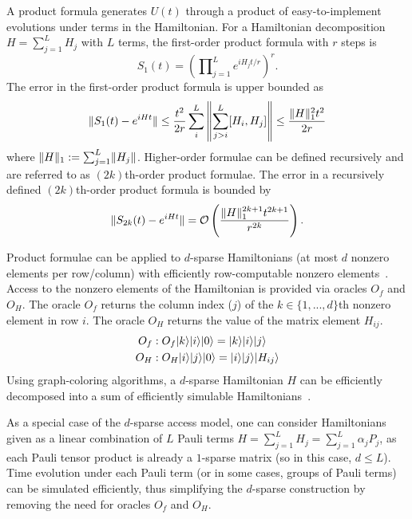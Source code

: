 \begin{refsection}
A product formula generates $U(t)$ through a product of easy-to-implement evolutions under terms in the Hamiltonian. For a Hamiltonian decomposition $H = \sum_{j=1}^L H_j$ with $L$ terms, the first-order product formula with $r$ steps is
\begin{equation}
    S_1(t) = \left( \prod\nolimits_{j=1}^L e^{iH_jt/r } \right)^r.
\end{equation}
The error in the first-order product formula is upper bounded as~\cite{childs2021TheoryTrotter}
\begin{equation}
    \lVert S_1(t) - e^{iHt} \rVert \leq \frac{t^2}{2r} \sum_i^L \left\lVert \sum_{j>i}^L [H_i, H_j] \right\rVert \leq \frac{\lVert H\rVert_1^2 t^2}{2r}
\end{equation}
where $\lVert H\rVert_1 := \sum_{j=1}^L \lVert H_j\rVert$. Higher-order formulae can be defined recursively and are referred to as $(2k)$th-order product formulae. The error in a recursively defined $(2k)$th-order product formula is bounded by~\cite{childs2021TheoryTrotter}
\begin{equation}
    \lVert S_{2k}(t) - e^{iHt} \rVert = \mathcal{O}\left( \frac{\lVert H\rVert_1^{2k+1} t^{2k+1}}{r^{2k}}  \right).
\end{equation}


Product formulae can be applied to $d$-sparse Hamiltonians (at most $d$ nonzero elements per row/column) with efficiently row-computable nonzero elements~\cite{aharononv2007AdiabaticQStateGeneration}. Access to the nonzero elements of the Hamiltonian is provided via oracles $O_f$ and $O_H$. The oracle $O_f$ returns the column index ($j$) of the $k \in \{1,...,d\}$th nonzero element in row $i$. The oracle $O_H$ returns the value of the matrix element $H_{ij}$.
\begin{align}
    O_f &: O_f \lvert k\rangle \lvert i\rangle \lvert0\rangle = \lvert k\rangle \lvert i\rangle \lvert j\rangle \\
    O_H &: O_H \lvert i\rangle\lvert j\rangle\lvert0\rangle = \lvert i\rangle\lvert j\rangle\lvert H_{ij}\rangle 
\end{align}
Using graph-coloring algorithms, a $d$-sparse Hamiltonian $H$ can be efficiently decomposed into a sum of efficiently simulable Hamiltonians~\cite{berry2005EffQAlgSimmSparseHam, childs2010StarHamiltonianSimulation}. 

As a special case of the $d$-sparse access model, one can consider Hamiltonians given as a linear combination of $L$ Pauli terms $H = \sum_{j=1}^L H_j = \sum_{j=1}^L \alpha_j P_j$, as each Pauli tensor product is already a $1$-sparse matrix (so in this case, $d\leq L$). Time evolution under each Pauli term (or in some cases, groups of Pauli terms) can be simulated efficiently, thus simplifying the $d$-sparse construction by removing the need for oracles $O_f$ and $O_H$.




\end{refsection}
